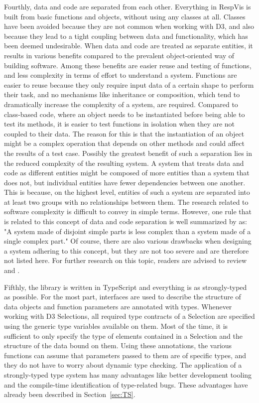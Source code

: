 Fourthly, data and code are separated from each other.
Everything in RespVis is built from basic functions and objects, without using any classes at all. 
Classes have been avoided because they are not common when working with D3, and also because they lead to a tight coupling between data and functionality, which has been deemed undesirable.
When data and code are treated as separate entities, it results in various benefits compared to the prevalent object-oriented way of building software.
Among these benefits are easier reuse and testing of functions, and less complexity in terms of effort to understand a system. 
Functions are easier to reuse because they only require input data of a certain shape to perform their task, and no mechanisms like inheritance or composition, which tend to dramatically increase the complexity of a system, are required.
Compared to class-based code, where an object needs to be instantiated before being able to test its methods, it is easier to test functions in isolation when they are not coupled to their data. 
The reason for this is that the instantiation of an object might be a complex operation that depends on other methods and could affect the results of a test case. 
Possibly the greatest benefit of such a separation lies in the reduced complexity of the resulting system.
A system that treats data and code as different entities might be composed of more entities than a system that does not, but individual entities have fewer dependencies between one another.
This is because, on the highest level, entities of such a system are separated into at least two groups with no relationships between them.
The research related to software complexity is difficult to convey in simple terms.
However, one rule that is related to this concept of data and code separation is well summarized by  as: "A system made of disjoint simple parts is less complex than a system made of a single complex part."
Of course, there are also various drawbacks when designing a system adhering to this concept, but they are not too severe and are therefore not listed here.
For further research on this topic, readers are advised to review  and .

Fifthly, the library is written in TypeScript and everything is as strongly-typed as possible.
For the most part, interfaces are used to describe the structure of data objects and function parameters are annotated with types.
Whenever working with D3 Selections, all required type contracts of a Selection are specified using the generic type variables available on them.
Most of the time, it is sufficient to only specify the type of elements contained in a Selection and the structure of the data bound on them.
Using these annotations, the various functions can assume that parameters passed to them are of specific types, and they do not have to worry about dynamic type checking.
The application of a strongly-typed type system has many advantages like better development tooling and the compile-time identification of type-related bugs.
These advantages have already been described in Section~\ref{sec:TS}.

